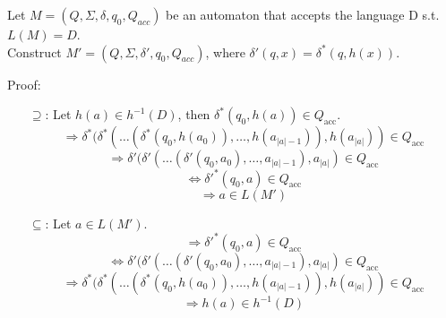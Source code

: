 Let $M = (Q, \Sigma, \delta, q_0, Q_{acc})$ be an automaton that accepts the language D s.t. $L(M) = D$.\\
Construct $M' = (Q, \Sigma, \delta', q_0, Q_{acc})$, where $\delta'(q,x) = \delta^*(q, h(x))$.

Proof:
\begin{itemize}
    \item[$\supseteq$:] Let \( h(a) \in h^{-1}(D) \), then \( \delta^*(q_0,h(a)) \in Q_{\text{acc}} \).
    \[
    \Rightarrow \delta^*(\delta^*(\dots(\delta^*(q_0,h(a_0)), \dots, h(a_{|a|-1})), h(a_{|a|})) \in Q_{\text{acc}}
    \]
    \[
    \Rightarrow \delta'(\delta'(\dots(\delta'(q_0, a_0), \dots, a_{|a|-1}), a_{|a|}) \in Q_{\text{acc}}
    \]
    \[
    \Leftrightarrow \delta'^*(q_0, a) \in Q_{\text{acc}}
    \]
    \[
    \Rightarrow a \in L(M')
    \]

    \item[$\subseteq$:] Let \( a \in L(M') \).
    \[
    \Rightarrow \delta'^*(q_0, a) \in Q_{\text{acc}}
    \]
    \[
    \Leftrightarrow \delta'(\delta'(\dots(\delta'(q_0, a_0), \dots, a_{|a|-1}), a_{|a|}) \in Q_{\text{acc}}
    \]
    \[
    \Rightarrow \delta^*(\delta^*(\dots(\delta^*(q_0, h(a_0)), \dots, h(a_{|a|-1})), h(a_{|a|})) \in Q_{\text{acc}}
    \]
    \[
    \Rightarrow h(a) \in h^{-1}(D)
    \]
    \qedsymbol
\end{itemize}



